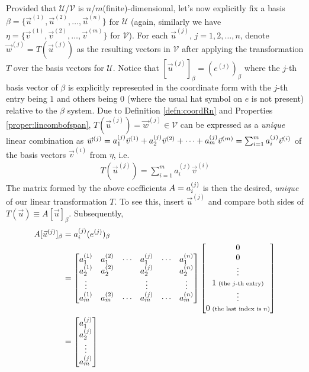 Provided that $\mathcal{U}$/$\mathcal{V}$ is $n$/$m$(finite)-dimensional, let's now explicitly fix a basis $\mathcal{\beta} = \{\vec{u}^{(1)}, \vec{u}^{(2)}, \ldots, \vec{u}^{(n)}\}$ for $\mathcal{U}$ (again, similarly we have $\mathcal{\eta} = \{\vec{v}^{(1)}, \vec{v}^{(2)}, \ldots, \allowbreak \vec{v}^{(m)}\}$ for $\mathcal{V}$). For each $\vec{u}^{(j)}$, $j = 1,2,\ldots,n$, denote $\vec{w}^{(j)} = T(\vec{u}^{(j)})$ as the resulting vectors in $\mathcal{V}$ after applying the transformation $T$ over the basis vectors for $\mathcal{U}$. Notice that $[\vec{u}^{(j)}]_\beta = (e^{(j)})_\beta$ where the $j$-th basis vector of $\mathcal{\beta}$ is explicitly represented in the coordinate form with the $j$-th entry being $1$ and others being $0$ (where the usual hat symbol on $e$ is not present) relative to the $\mathcal{\beta}$ system. Due to Definition \ref{defn:coordRn} and Properties \ref{proper:lincombofspan}, $T(\vec{u}^{(j)}) = \vec{w}^{(j)} \in \mathcal{V}$ can be expressed as a \textit{unique} linear combination as $\vec{w}^{(j)} = \smash{a_1^{(j)}}\vec{v}^{(1)} + \smash{a_2^{(j)}}\vec{v}^{(2)} + \cdots + \smash{a_m^{(j)}}\vec{v}^{(m)} = \sum_{i=1}^{m} \smash{a_i^{(j)}}\vec{v}^{(i)}$ of the basis vectors $\vec{v}^{(i)}$ from $\mathcal{\eta}$, i.e.\
\begin{align}
T(\vec{u}^{(j)}) = \sum_{i=1}^{m} a_i^{(j)}\vec{v}^{(i)}
\end{align}
The matrix formed by the above coefficients $A = \smash{a_i^{(j)}}$ is then the desired, \textit{unique}  of our linear transformation $T$. To see this, insert $\vec{u}^{(j)}$ and compare both sides of $T(\vec{u}) \equiv A[\vec{u}]_\beta$. Subsequently,
\begin{align*}
A[\vec{u}^{(j)}]_\beta &= a_i^{(j)}(e^{(j)})_\beta \\
&=
\begin{bmatrix}
a_1^{(1)} & a_1^{(2)} & \cdots & a_1^{(j)} & \cdots & a_1^{(n)} \\
a_2^{(1)} & a_2^{(2)} & & a_2^{(j)} & & a_2^{(n)} \\
\vdots & & & \vdots & & \vdots \\
a_m^{(1)} & a_m^{(2)} & \cdots & a_m^{(j)} & \cdots & a_m^{(n)}
\end{bmatrix}
\begin{bmatrix}
0 \\
0 \\
\vdots \\
1 {\scriptsize \text{ (the $j$-th entry)}} \\
\vdots \\
0 {\scriptsize \text{ (the last index is $n$)}}
\end{bmatrix} \\
&=
\begin{bmatrix}
a_1^{(j)} \\
a_2^{(j)} \\
\vdots \\
a_m^{(j)}
\end{bmatrix}
\end{align*}
